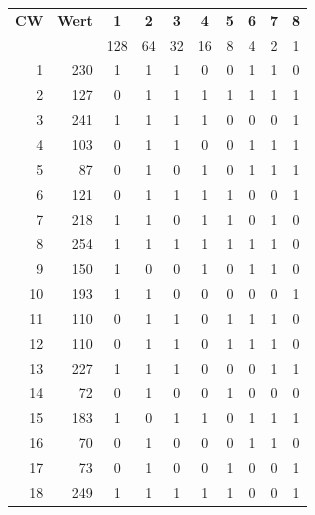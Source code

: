 \begin{center}
\footnotesize
\setlength{\tabcolsep}{4pt}
\renewcommand{\arraystretch}{1.2}
\begin{tabular}{r|r|cccccccc}
\toprule
\textbf{CW} & \textbf{Wert} & \textbf{1} & \textbf{2} & \textbf{3} & \textbf{4} & \textbf{5} & \textbf{6} & \textbf{7} & \textbf{8} \\
& & \tiny 128 & \tiny 64 & \tiny 32 & \tiny 16 & \tiny 8 & \tiny 4 & \tiny 2 & \tiny 1 \\
\midrule
1 & 230 & 1 & 1 & 1 & 0 & 0 & 1 & 1 & 0 \\
2 & 127 & 0 & 1 & 1 & 1 & 1 & 1 & 1 & 1 \\
3 & 241 & 1 & 1 & 1 & 1 & 0 & 0 & 0 & 1 \\
4 & 103 & 0 & 1 & 1 & 0 & 0 & 1 & 1 & 1 \\
5 & 87 & 0 & 1 & 0 & 1 & 0 & 1 & 1 & 1 \\
6 & 121 & 0 & 1 & 1 & 1 & 1 & 0 & 0 & 1 \\
7 & 218 & 1 & 1 & 0 & 1 & 1 & 0 & 1 & 0 \\
8 & 254 & 1 & 1 & 1 & 1 & 1 & 1 & 1 & 0 \\
9 & 150 & 1 & 0 & 0 & 1 & 0 & 1 & 1 & 0 \\
10 & 193 & 1 & 1 & 0 & 0 & 0 & 0 & 0 & 1 \\
11 & 110 & 0 & 1 & 1 & 0 & 1 & 1 & 1 & 0 \\
12 & 110 & 0 & 1 & 1 & 0 & 1 & 1 & 1 & 0 \\
13 & 227 & 1 & 1 & 1 & 0 & 0 & 0 & 1 & 1 \\
14 & 72 & 0 & 1 & 0 & 0 & 1 & 0 & 0 & 0 \\
15 & 183 & 1 & 0 & 1 & 1 & 0 & 1 & 1 & 1 \\
16 & 70 & 0 & 1 & 0 & 0 & 0 & 1 & 1 & 0 \\
17 & 73 & 0 & 1 & 0 & 0 & 1 & 0 & 0 & 1 \\
18 & 249 & 1 & 1 & 1 & 1 & 1 & 0 & 0 & 1 \\
\bottomrule
\end{tabular}
\end{center}
